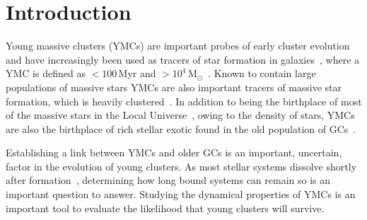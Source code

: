\documentclass[useAMS,usenatbib]{mn2e}
\begin{document}
\section{Introduction} %
\label{sec:introduction}

Young massive clusters (YMCs) are important probes of early cluster evolution and have increasingly been used as tracers of star formation in galaxies~\citep[e.g.][]{1995AJ....109..960W,1997AJ....114.2381M,1999AJ....118..752Z}, where a YMC is defined as $<100\,$Myr and $>10^{4}\,$M$_{\odot}$~\citep{2010ARA&A..48..431P}.
Known to contain large populations of massive stars YMCs are also important tracers of massive star formation, which is heavily clustered~\citep{2005A&A...437..247D,2007MNRAS.380.1271P}.
In addition to being the birthplace of most of the massive stars in the Local Universe~\citep[$>200\,$M$_{\odot}$ stars in R136][]{2010MNRAS.408..731C}, owing to the density of stars, YMCs are also the birthplace of rich stellar exotic found in the old population of GCs~\citep{2010ARA&A..48..431P}.

Establishing a link between YMCs and older GCs is an important, uncertain, factor in the evolution of young clusters.
As most stellar systems dissolve shortly after formation~\citep{2003ARA&A..41...57L}, determining how long bound systems can remain so is an important question to answer.
Studying the dynamical properties of YMCs is an important tool to evaluate the likelihood that young clusters will survive.


\end{document}
